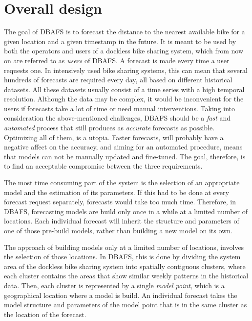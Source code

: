 \documentclass[12pt,oneside]{reedthesis}
\begin{document}
\section{Overall design}\label{overall-design}

The goal of DBAFS is to forecast the distance to the nearest available
bike for a given location and a given timestamp in the future. It is
meant to be used by both the operators and users of a dockless bike
sharing system, which from now on are referred to as \emph{users} of
DBAFS. A forecast is made every time a user requests one. In intensively
used bike sharing systems, this can mean that several hundreds of
forecasts are required every day, all based on different historical
datasets. All these datasets usually consist of a time series with a
high temporal resolution. Although the data may be complex, it would be
inconvenient for the users if forecasts take a lot of time or need
manual interventions. Taking into consideration the above-mentioned
challenges, DBAFS should be a \emph{fast} and \emph{automated} process
that still produces as \emph{accurate} forecasts as possible. Optimizing
all of them, is a utopia. Faster forecasts, will probably have a
negative affect on the accuracy, and aiming for an automated procedure,
means that models can not be manually updated and fine-tuned. The goal,
therefore, is to find an acceptable compromise between the three
requirements.

The most time consuming part of the system is the selection of an
appropriate model and the estimation of its parameters. If this had to
be done at every forecast request separately, forecasts would take too
much time. Therefore, in DBAFS, forecasting models are build only once
in a while at a limited number of locations. Each individual forecast
will inherit the structure and parameters of one of those pre-build
models, rather than building a new model on its own.

The approach of building models only at a limited number of locations,
involves the selection of those locations. In DBAFS, this is done by
dividing the system area of the dockless bike sharing system into
spatially contiguous clusters, where each cluster contains the areas
that show similar weekly patterns in the historical data. Then, each
cluster is represented by a single \emph{model point}, which is a
geographical location where a model is build. An individual forecast
takes the model structure and parameters of the model point that is in
the same cluster as the location of the forecast.
\end{document}
